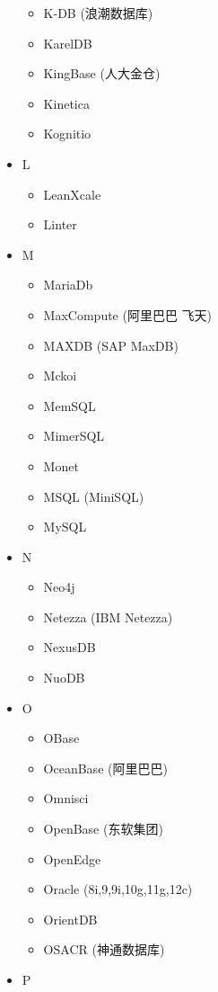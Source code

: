 \documentclass[
]{book}
\providecommand{\tightlist}{%
  \setlength{\itemsep}{0pt}\setlength{\parskip}{0pt}}
\begin{document}
\begin{itemize}
  \begin{itemize}
  \tightlist
  \item
    K-DB (浪潮数据库)
  \item
    KarelDB
  \item
    KingBase (人大金仓)
  \item
    Kinetica\\
  \item
    Kognitio
  \end{itemize}
\item
  L

  \begin{itemize}
  \tightlist
  \item
    LeanXcale\\
  \item
    Linter
  \end{itemize}
\item
  M

  \begin{itemize}
  \tightlist
  \item
    MariaDb
  \item
    MaxCompute (阿里巴巴 飞天)
  \item
    MAXDB (SAP MaxDB)
  \item
    Mckoi
  \item
    MemSQL
  \item
    MimerSQL
  \item
    Monet
  \item
    MSQL (MiniSQL)
  \item
    MySQL
  \end{itemize}
\item
  N

  \begin{itemize}
  \tightlist
  \item
    Neo4j
  \item
    Netezza (IBM Netezza)
  \item
    NexusDB
  \item
    NuoDB\\
  \end{itemize}
\item
  O

  \begin{itemize}
  \tightlist
  \item
    OBase
  \item
    OceanBase (阿里巴巴)
  \item
    Omnisci
  \item
    OpenBase (东软集团)
  \item
    OpenEdge
  \item
    Oracle (8i,9,9i,10g,11g,12c)
  \item
    OrientDB
  \item
    OSACR (神通数据库)
  \end{itemize}
\item
  P


\end{itemize}
\end{document}
